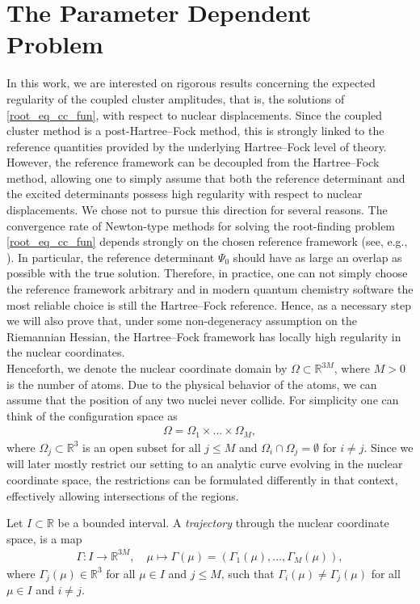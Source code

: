 \documentclass[reqno]{amsart}
\begin{document}
\section{The Parameter Dependent Problem}\label{sec:parameter_cc}In this work, we are interested on rigorous results concerning the expected regularity of the coupled cluster amplitudes, that is, the solutions of \eqref{root_eq_cc_fun}, with respect to nuclear displacements. Since the coupled cluster method is a post-Hartree–Fock method, this is strongly linked to the reference quantities provided by the underlying Hartree–Fock level of theory. However, the reference framework can be decoupled from the Hartree–Fock method, allowing one to simply assume that both the reference determinant and the excited determinants possess high regularity with respect to nuclear displacements. We chose not to pursue this direction for several reasons. The convergence rate of Newton-type methods for solving the root-finding problem \eqref{root_eq_cc_fun} depends strongly on the chosen reference framework (see, e.g., \cite{Schneider2009, helgakar}). In particular, the reference determinant $\Psi_0$ should have as large an overlap as possible with the true solution. Therefore, in practice, one can not simply choose the reference framework arbitrary and in modern quantum chemistry software the most reliable choice is still the Hartree–Fock reference. Hence, as a necessary step we will also prove that, under some non-degeneracy assumption on the Riemannian Hessian, the Hartree–Fock framework has locally high regularity in the nuclear coordinates.\\
\newline
Henceforth, we denote the nuclear coordinate domain by $\Omega\subset\mathbb{R}^{3M}$, where $M>0$ is the number of atoms. Due to the physical behavior of the atoms, we can assume that the position of any two nuclei never collide. For simplicity one can think of the configuration space as
\begin{align}\label{multidim_coord_sp}
    \Omega=\Omega_1\times \ldots \times \Omega_M,
\end{align}
where $\Omega_j\subset \mathbb{R}^3$ is an open subset for all $j\le M$ and $\Omega_i\cap\Omega_j=\emptyset$ for $i\ne j$. Since we will later mostly restrict our setting to an analytic curve evolving in the nuclear coordinate space, the restrictions can be formulated differently in that context, effectively allowing intersections of the regions.
\begin{definition}\label{trajectory_nuc_spac}
    Let $I\subset \mathbb{R}$ be a bounded interval. A \textit{trajectory} through the nuclear coordinate space, is a map 
    \begin{align}
        \Gamma:I\longrightarrow \mathbb{R}^{3M},\quad \mu\mapsto \Gamma(\mu)=(\Gamma_1(\mu),\ldots,\Gamma_M(\mu)),
    \end{align}
    where $\Gamma_j(\mu) \in \mathbb{R}^3$ for all $\mu\in I$ and $j\le M$, such that $\Gamma_i(\mu)\ne \Gamma_j(\mu)$ for all $\mu \in I$ and $i\ne j$.
\end{definition}
\end{document}
